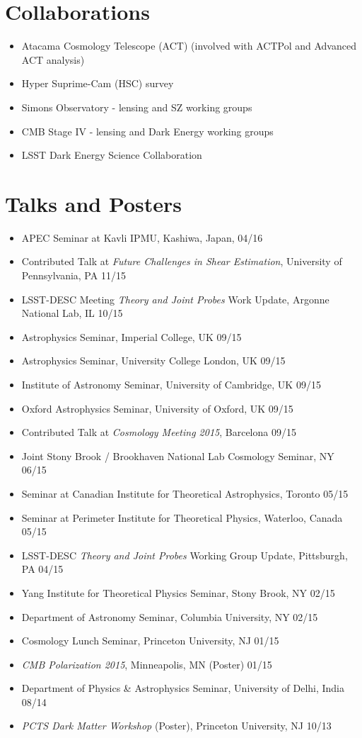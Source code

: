 \documentclass[10pt,margin]{res}
\begin{document}
\begin{resume}
\section{Collaborations}
\begin{itemize}
\item Atacama Cosmology Telescope (ACT) (involved with ACTPol and Advanced ACT analysis)
\item Hyper Suprime-Cam (HSC) survey
\item Simons Observatory - lensing and SZ working groups
\item CMB Stage IV - lensing and Dark Energy working groups
\item LSST Dark Energy Science Collaboration
\end{itemize}

\section{Talks and Posters}

\begin{itemize}
\item APEC Seminar at Kavli IPMU, Kashiwa, Japan, 04/16
\item Contributed Talk at {\sl Future Challenges in Shear Estimation}, University of Pennsylvania, PA 11/15
\item LSST-DESC Meeting {\sl Theory and Joint Probes} Work Update, Argonne National Lab, IL 10/15
\item Astrophysics Seminar, Imperial College, UK 09/15
\item Astrophysics Seminar, University College London, UK 09/15
\item Institute of Astronomy Seminar, University of Cambridge, UK 09/15
\item Oxford Astrophysics Seminar, University of Oxford, UK 09/15
\item Contributed Talk at {\sl Cosmology Meeting 2015}, Barcelona 09/15
\item Joint Stony Brook / Brookhaven National Lab Cosmology Seminar, NY 06/15
\item Seminar at Canadian Institute for Theoretical Astrophysics, Toronto 05/15
\item Seminar at Perimeter Institute for Theoretical Physics, Waterloo, Canada 05/15
\item LSST-DESC {\sl Theory and Joint Probes} Working Group Update, Pittsburgh, PA 04/15
\item Yang Institute for Theoretical Physics Seminar, Stony Brook, NY 02/15
\item Department of Astronomy Seminar, Columbia University, NY 02/15
\item Cosmology Lunch Seminar, Princeton University, NJ 01/15
\item {\sl CMB Polarization 2015}, Minneapolis, MN (Poster) 01/15
\item Department of Physics \& Astrophysics Seminar, University of Delhi, India 08/14
\item {\sl PCTS Dark Matter Workshop} (Poster), Princeton University, NJ 10/13
\end{itemize}


\end{resume}
\end{document}
